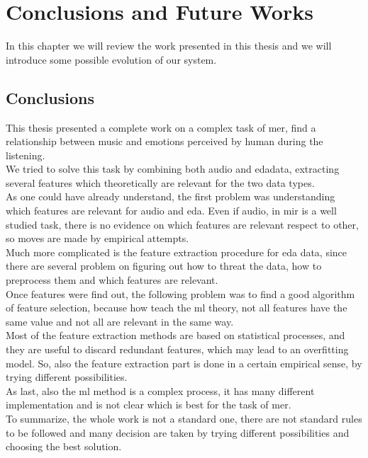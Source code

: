 \chapter{Conclusions and Future Works}
\label{chap:Conclusions}
\pagestyle{plain}
\vspace{0.5cm}

\noindent

In this chapter we will review the work presented in this thesis and we will introduce some possible evolution of our system.

\section{Conclusions}
This thesis presented a complete work on a complex task of \gls{mer}, find a relationship between music and emotions perceived by human during the listening.
\\
We tried to solve this task by combining both audio and \gls{eda}data, extracting several features which theoretically are relevant for the two data types.
\\ \indent
As one could have already understand, the first problem was understanding which features are relevant for audio and \gls{eda}. Even if audio, in \gls{mir} is a well studied task, there is no evidence on which features are relevant respect to other, so moves are made by empirical attempts.
\\
Much more complicated is the feature extraction procedure for \gls{eda} data, since there are several problem on figuring out how to threat the data, how to preprocess them and which features are relevant.
\\ \indent
Once features were find out, the following problem was to find a good algorithm of feature selection, because how teach the \gls{ml} theory, not all features have the same value and not all are relevant in the same way.
\\
Most of the feature extraction methods are based on statistical processes, and they are useful to discard redundant features, which may lead to an overfitting model. So, also the feature extraction part is done in a certain empirical sense, by trying different possibilities.
\\ \indent
As last, also the \gls{ml} method is a complex process, it has many different implementation and is not clear which is best for the task of \gls{mer}.
\\ \indent
To summarize, the whole work is not a standard one, there are not standard rules to be followed and many decision are taken by trying different possibilities and choosing the best solution.
